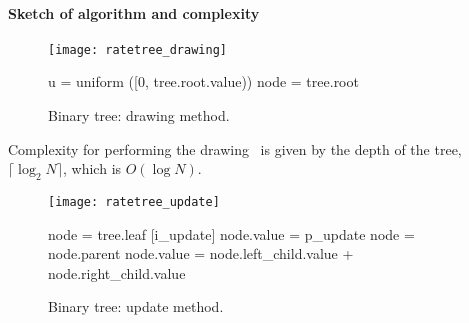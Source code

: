 \paragraph{Sketch of algorithm and complexity}
\begin{figure}[!h]
  \begin{minipage}{0.5\textwidth}
    \texttt{[image: ratetree\_drawing]}
  \end{minipage}
  \begin{minipage}{0.5\textwidth}
    \begin{algorithm}[H]
      \SetAlgoLined{}
      u = uniform ([0, tree.root.value))\;
        node = tree.root\;
              {
              }
    \end{algorithm}
  \end{minipage}
  \caption{Binary tree: drawing method.}
\label{fig:tree_drawing}
\end{figure}

Complexity for performing the drawing~ is given by the depth of the tree,
$\lceil\log_2 N\rceil$, which is $O(\log N)$.

\begin{figure}[!h]
  \begin{minipage}{0.5\textwidth}
    \texttt{[image: ratetree\_update]}
  \end{minipage}
  \begin{minipage}{0.5\textwidth}
    \begin{algorithm}[H]
      \SetAlgoLined{}
      node = tree.leaf [i\_update]\;
      node.value = p\_update\;
            {
              node = node.parent\;
              node.value = node.left\_child.value + node.right\_child.value\;
            }
    \end{algorithm}
  \end{minipage}
  \caption{Binary tree: update method.}
\label{fig:tree_update}
\end{figure}

